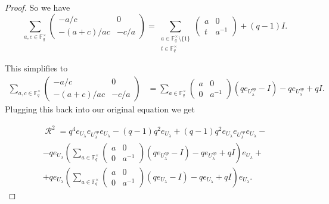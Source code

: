 \documentclass[10pt,a4paper]{amsart}
\DeclareMathOperator{\R}{\mathcal{R}}
\begin{document}
\begin{proof}
So we have
\[
\sum_{a, c \in \mathbb{F}_q^{\times}}\begin{pmatrix}
    -a/c & 0 \\
    -(a+c)/ac & -c/a 
    \end{pmatrix} = 
\sum_{\substack{a \in \mathbb{F}_q^\times \setminus \{1\}\\ t\in \mathbb{F}_q^{\times}}} \begin{pmatrix}
a & 0 \\
t & a^{-1}
\end{pmatrix} + (q-1) I.\]

This simplifies to
\begin{align*}
    \sum_{a, c \in \mathbb{F}_q^{\times}}\begin{pmatrix}
    -a/c & 0 \\
    -(a+c)/ac & -c/a 
    \end{pmatrix} &= \sum_{a \in \mathbb{F}_q^\times} \begin{pmatrix}
    a & 0 \\
    0 & a^{-1}
    \end{pmatrix} (qe_{U_{\lambda}^{op}} - I)- qe_{U_{\lambda}^{op}}+q I.
\end{align*}
Plugging this back into our original equation we get

\begin{multline*}
    \R^2 =  q^4e_{U_{\lambda}}e_{U_{\lambda}^{op}}e_{U_{\lambda}} -  (q-1) q^2e_{U_{\lambda}} +  (q-1) q^2e_{U_{\lambda}}e_{U_{\lambda}^{op}}e_{U_{\lambda}}-\\
    - qe_{U_{\lambda}} \left( \sum_{a \in \mathbb{F}_q^\times} \begin{pmatrix}
    a & 0 \\
    0 & a^{-1}
    \end{pmatrix} (qe_{U_{\lambda}^{op}} - I)- qe_{U_{\lambda}^{op}}+q I\right) e_{U_{\lambda}}+\\
    + qe_{U_{\lambda}} \left(  \sum_{a \in \mathbb{F}_q^\times} \begin{pmatrix}
    a & 0 \\
    0 & a^{-1}
    \end{pmatrix} (qe_{U_{\lambda}} - I)- qe_{U_{\lambda}}+q I \right) e_{U_{\lambda}}.
\end{multline*}


\end{proof}
\end{document}
